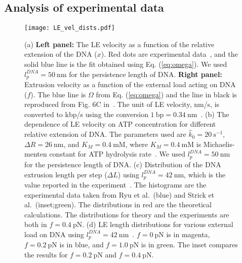 \documentclass[fleqn,10pt]{wlscirep}
\newcommand{\pN}{\ \mathrm{pN}}
\newcommand{\nm}{\ \mathrm{nm}}
\newcommand{\bp}{\ \mathrm{bp}}
\newcommand{\persec}{\ \mathrm{s}^{-1}}
\newcommand{\mMol}{\mathrm{mM}}
\newcommand{\DR}{\Delta {R}}
\begin{document}
\subsection*{Analysis of experimental data}
\begin{figure}[]
\centering
\texttt{[image: LE\_vel\_dists.pdf]}
\caption{\label{fig:fit_model}  (a) {\bf Left panel:} The LE velocity  as a function of the relative extension of the DNA ($x$). Red dots are experimental data~\cite{ganji2018real}, and the solid blue line is the fit obtained using Eq. (\ref{eq:omega}). We used $l_p^{DNA}= 50\nm$ for the persistence length of DNA. {\bf Right panel:} Extrusion velocity as a function of the external load acting on DNA ($f$). The blue line is $\Omega$ from Eq. (\ref{eq:omega}) and the line in black is reproduced from Fig. 6C in~\cite{marko2019dna}. The unit of LE velocity, nm/s, is converted to kbp/s using the conversion $1\bp=0.34\nm$~\cite{alberts2013essential}. (b)  The dependence of LE velocity on ATP concentration  for different relative extension of DNA. The parameters used are $\hat{k}_0=20\persec$, $\DR=26 \nm$, and $K_M=0.4\ \mMol$, where $K_M=0.4\ \mMol$ is Michaelis-menten constant for ATP hydrolysis rate~\cite{terakawa2017condensin}. We used $l_p^{DNA}= 50\nm$ for the persistence length of DNA.
(c)
Distribution of the DNA extrusion length per step ($\Delta L$) using $l^{DNA}_p=42\nm$, which is the value reported in the experiment~\cite{ryu2020resolving}. The histograms are the experimental data taken from Ryu et al.~\cite{ryu2020resolving}(blue) and Strick et al.~\cite{strick2004real}(inset;green). The distributions in red are the theoretical calculations. The distributions for theory and the experiments are both in $f=0.4\pN$.
(d) LE length distributions for various external load on DNA using $l_p^{DNA}= 42\nm$~\cite{ryu2020resolving}. $f=0\pN$ is in magenta, $f=0.2\pN$ is in blue, and $f=1.0\pN$ is in green. The inset compares the results for $f=0.2\pN$ and $f=0.4\pN$.
}
\end{figure}
\end{document}
